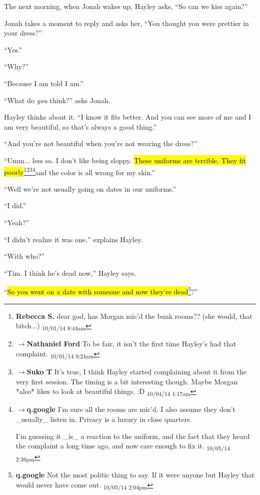 
The next morning, when Jonah wakes up, Hayley asks, ``So can we kiss again?''

Jonah takes a moment to reply and asks her, ``You thought you were prettier in your dress?''

``Yes.''

``Why?''

``Because I am told I am.''

``What do \textit{you} think?'' asks Jonah.

Hayley thinks about it.  ``I know it fits better.  And you can see more of me and I am very beautiful, so that's always a good thing.''

``And you're not beautiful when you're not wearing the dress?''

``Umm... less so.  I don't like being sloppy.  \hl{These uniforms are terrible.  They fit poorly}\footnote{\textbf{Rebecca S. }dear god, has Morgan mic'd the bunk rooms?? (she would, that bitch...) \textsubscript{10/01/14 8:44am}}\footnote{$\rightarrow$\textbf{Nathaniel Ford }To be fair, it isn't the first time Hayley's had that complaint. \textsubscript{10/01/14 9:24am}}\footnote{$\rightarrow$\textbf{Suko T }It's true, I think Hayley started complaining about it from the very first session. The timing is a bit interesting though.  Maybe Morgan *also* likes to look at beautiful things. :D \textsubscript{10/04/14 1:17am}}\footnote{$\rightarrow$\textbf{q.google }I'm sure all the rooms are mic'd.  I also assume they don't \_usually\_ listen in.  Privacy is a luxury in close quarters.

I'm guessing it \_is\_ a reaction to the uniform, and the fact that they heard the complaint a long time ago, and now care enough to fix it. \textsubscript{10/05/14 2:36pm}}and the color is all wrong for my skin.''

``Well we're not usually going on dates in our uniforms.''

``I did.''

``Yeah?''

``I didn't realize it was one,'' explains Hayley.

``With who?''

``Tim.  I think he's dead now,'' Hayley says.  

``\hl{So you went on a date with someone and now they're dead}\footnote{\textbf{q.google }Not the most politic thing to say.  If it were anyone but Hayley that would never have come out. \textsubscript{10/05/14 2:04pm}}?''

